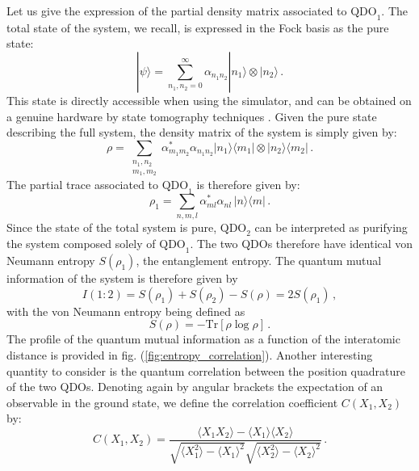 \documentclass[reprint, amsmath, amssymb, floatfix, aps, pra]{revtex4-2}
\begin{document}
    Let us give the expression of the partial density matrix associated to $\text{QDO}_1$. The total state of the system, we recall, is expressed in the Fock basis as the pure state:
    \begin{equation*}
        |\psi\rangle = \sum_{n_1,n_{2}=0}^\infty \alpha_{n_1n_2}|n_1\rangle\otimes|n_2\rangle\,.
    \end{equation*}
    This state is directly accessible when using the simulator, and can be obtained on a genuine hardware by state tomography techniques \cite{Lvovsky:2009zz}. Given the pure state describing the full system, the density matrix of the system is simply given by:
    \begin{equation*}
        \rho = \sum_{\substack{n_1,n_2 \\ m_1,m_2}} \alpha^*_{m_1m_2}\alpha_{n_1n_2}|n_1\rangle\langle m_1|\otimes|n_2\rangle\langle m_2|\,.
    \end{equation*}
    The partial trace associated to $\text{QDO}_1$ is therefore given by:
    \begin{equation*}
        \rho_1 = \sum_{n, m, l} \alpha^*_{ml}\alpha_{nl}\,|n\rangle\langle m|\,.
    \end{equation*}
    Since the state of the total system is pure, $\text{QDO}_2$ can be interpreted as purifying the system composed solely of $\text{QDO}_1$. The two QDOs therefore have identical von Neumann entropy $S(\rho_1)$, the entanglement entropy. The quantum mutual information of the system is therefore given by
    \begin{equation*}
        I(1:2) = S(\rho_1) + S(\rho_2) - S(\rho) = 2S(\rho_1) \,,
    \end{equation*}
    with the von Neumann entropy being defined as
    \begin{equation*}
        S(\rho) = -\text{Tr}\left[\rho\log\rho\right]\,.
    \end{equation*}
    The profile of the quantum mutual information as a function of the interatomic distance is provided in fig. (\ref{fig:entropy_correlation}).
    Another interesting quantity to consider is the quantum correlation between the position quadrature of the two QDOs. Denoting again by angular brackets the expectation of an observable in the ground state, we define the correlation coefficient $C(X_1, X_2)$ by:
    \begin{equation*}
        C(X_1, X_2) = \frac{\langle X_1X_2\rangle - \langle X_1\rangle\langle X_2\rangle}{\sqrt{\langle X_1^2\rangle - \langle X_1\rangle^2}\sqrt{\langle X_2^2\rangle - \langle X_2\rangle^2}}\,.
    \end{equation*}
\end{document}
